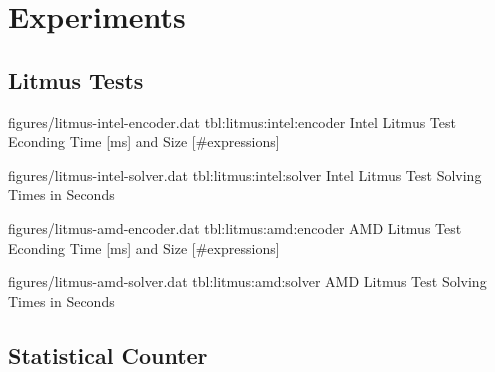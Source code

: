 
\section{Experiments}

\subsection{Litmus Tests}

\newcommand{\StatsTableRowHeader}[1]{\hyperref[tbl:#1]{\StrBehind[2]{#1}{:}}}


\EncoderStatsTable
  {figures/litmus-intel-encoder.dat}
  {tbl:litmus:intel:encoder}
  {Intel Litmus Test Econding Time [ms] and Size [\#expressions]}


\SolverStatsTable
  {figures/litmus-intel-solver.dat}
  {tbl:litmus:intel:solver}
  {Intel Litmus Test Solving Times in Seconds}

\newpage


\EncoderStatsTable
  {figures/litmus-amd-encoder.dat}
  {tbl:litmus:amd:encoder}
  {AMD Litmus Test Econding Time [ms] and Size [\#expressions]}


\SolverStatsTable
  {figures/litmus-amd-solver.dat}
  {tbl:litmus:amd:solver}
  {AMD Litmus Test Solving Times in Seconds}

\newpage

\subsection{Statistical Counter}

\renewcommand{\StatsTableRowHeader}[1]{\texttt{#1}}

\bigbreak\noindent
{}\bigbreak\noindent
{}\bigbreak

